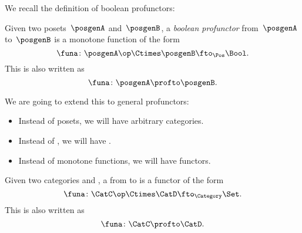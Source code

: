 We recall the definition of boolean profunctors:

\begin{ctdefinition}
    \label{def:boolean-profunctor-again}
    Given two posets~$\posgenA$ and~$\posgenB$, a \emph{boolean profunctor} from~$\posgenA$ to~$\posgenB$ is a monotone function of the form
    \begin{equation}
        \label{eq:boolean-profunctor-funa}
        \funa\colon \posgenA\op \Ctimes \posgenB \fto_{\Pos} \Bool.
    \end{equation}
    This is also written as
    \begin{equation}
        \funa\colon \posgenA \profto \posgenB.
    \end{equation}
\end{ctdefinition}

We are going to extend this to general profunctors:
\begin{itemize}
    \item Instead of posets, we will have arbitrary categories.
    \item Instead of \Bool, we will have \Set.
    \item Instead of monotone functions, we will have functors.
\end{itemize}

\begin{ctdefinition}[Profunctors]
    \label{def:profunctor}
    Given two categories \CatC and \CatD, a \emph{} from \CatC to \CatD is a functor of the form
    \begin{equation}
        \label{eq:profunctors-def-1}
        \funa\colon \CatC\op \Ctimes \CatD \fto_{\Category} \Set.
    \end{equation}
    This is also written as
    \begin{equation}
        \label{eq:profunctors-def-2}
        \funa\colon \CatC \profto \CatD.
    \end{equation}
\end{ctdefinition}

